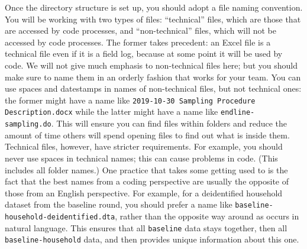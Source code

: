 Once the directory structure is set up,
you should adopt a file naming convention.
You will be working with two types of files:
``technical'' files, which are those that are accessed by code processes,
and ``non-technical'' files, which will not be accessed by code processes.
The former takes precedent: an Excel file is a technical file
even if it is a field log, because at some point it will be used by code.
We will not give much emphasis to non-technical files here;
but you should make sure to name them
in an orderly fashion that works for your team.
You can use spaces and datestamps in names of non-technical files, but not technical ones:
the former might have a name like \texttt{2019-10-30 Sampling Procedure Description.docx}
while the latter might have a name like \texttt{endline-sampling.do}.
This will ensure you can find files within folders
and reduce the amount of time others will spend opening files
to find out what is inside them.
Technical files, however, have stricter requirements.
For example, you should never use spaces in technical names;
this can cause problems in code. (This includes all folder names.)
One practice that takes some getting used to
is the fact that the best names from a coding perspective
are usually the opposite of those from an English perspective.
For example, for a deidentified household dataset from the baseline round,
you should prefer a name like \texttt{baseline-household-deidentified.dta},
rather than the opposite way around as occurs in natural language.
This ensures that all \texttt{baseline} data stays together,
then all \texttt{baseline-household} data,
and then provides unique information about this one.

